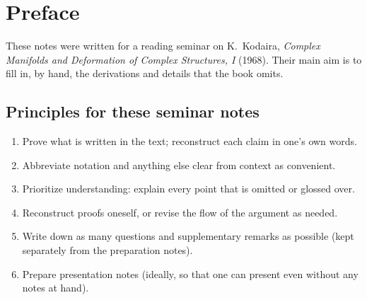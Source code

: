 \chapter*{Preface}

These notes were written for a reading seminar on K.~Kodaira,
\emph{Complex Manifolds and Deformation of Complex Structures, I} (1968). Their
main aim is to fill in, by hand, the derivations and details that the book
omits.

\section*{Principles for these seminar notes}

\begin{enumerate}
  \item Prove what is written in the text; reconstruct each claim in one's own
        words.
  \item Abbreviate notation and anything else clear from context as convenient.
  \item Prioritize understanding: explain every point that is omitted or glossed
        over.
  \item Reconstruct proofs oneself, or revise the flow of the argument as
        needed.
  \item Write down as many questions and supplementary remarks as possible
        (kept separately from the preparation notes).
  \item Prepare presentation notes (ideally, so that one can present even
        without any notes at hand).
\end{enumerate}
